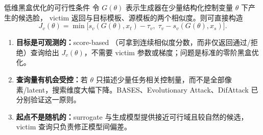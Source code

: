\begin{frame}{低维黑盒优化的可行性条件}
  \footnotesize
  \vspace{-2em}
  令 $G(\theta)$ 表示生成器在少量结构化控制变量 $\theta$ 下产生的候选脸，
  victim 返回与目标模板、源模板的两个相似度。则可直接构造
  \[
    J_v(\theta)=\min\big[
      s_v(G(\theta),x_t)-\tau_v,\;
      \tau_v-s_v(G(\theta),x_s)
    \big].
  \]

  \begin{enumerate}\setlength{\itemsep}{2pt}
    \item \textbf{目标是可观测的：}score-based （可拿到连续相似度分数，而非仅返回通过/拒绝）查询给出 $J_v(\theta)$，不需要 victim 参数或梯度；问题是标准的零阶黑盒优化。
    \item \textbf{查询量有机会受控：}若 $\theta$ 只描述少量任务相关控制量，而不是全部像素/latent，搜索维度大幅下降。BASES、Evolutionary Attack、DifAttack 已分别验证这一原则。
    \item \textbf{起点不是随机的：}surrogate 与生成模型提供接近可行域且较自然的候选，victim 查询只负责修正模型间偏差。
  \end{enumerate}

\end{frame}

